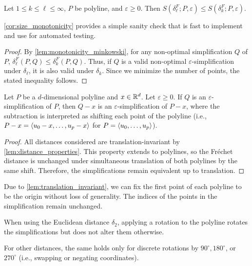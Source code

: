 \begin{corollary}\label{cor:size_monotonicity}
	Let \(1 \leq k \leq \ell \leq \infty\),
	\(P\) be polyline, and \(\varepsilon \geq 0\). Then \(S(\delta^F_\ell; P, \varepsilon) \leq S(\delta_k^F; P, \varepsilon)\).
\end{corollary}

\cref{cor:size_monotonicity} provides a simple sanity check that is fast to implement and use for automated testing.

\begin{proof}
	By \cref{lem:monotonicity_minkowski}, for any non-optimal simplification \(Q\) of \(P\), \(\delta_\ell^F(P, Q) \leq \delta_k^F(P, Q)\). Thus, if \(Q\) is a valid non-optimal \(\varepsilon\)-simplification under \(\delta_\ell\), it is also valid under \(\delta_k\). Since we minimize the number of points, the stated inequality follows.
\end{proof}

\begin{lemma}\label{lem:translation_invariant}
	Let \(P\) be a \(d\)-dimensional polyline and \(x \in \mathbb{R}^d\). Let \(\varepsilon \geq 0\). If \(Q\) is an \(\varepsilon\)-simplification of \(P\), then \(Q-x\) is an \(\varepsilon\)-simplification of \(P-x\), where the subtraction is interpreted as shifting each point of the polyline (i.e., \(P-x = \left\langle u_0 - x, \dots, u_p - x\right\rangle\) for \(P = \left\langle u_0,\dots, u_p\right\rangle\)).
\end{lemma}

\begin{proof}
	All distances considered are translation-invariant by \cref{lem:distance_properties}. This property extends to polylines, so the Fréchet distance is unchanged under simultaneous translation of both polylines by the same shift. Therefore, the simplifications remain equivalent up to translation.
\end{proof}

Due to \cref{lem:translation_invariant}, we can fix the first point of each polyline to be the origin without loss of generality. The indices of the points in the simplification remain unchanged.

\begin{corollary}\label{cor:rot_inv}
  When using the Euclidean distance \(\delta_2\), applying a rotation to the polyline rotates the simplifications but does not alter them otherwise.

	For other distances, the same holds only for discrete rotations by \(90^\circ, 180^\circ\), or \(270^\circ\) (i.e., swapping or negating coordinates).
\end{corollary}

